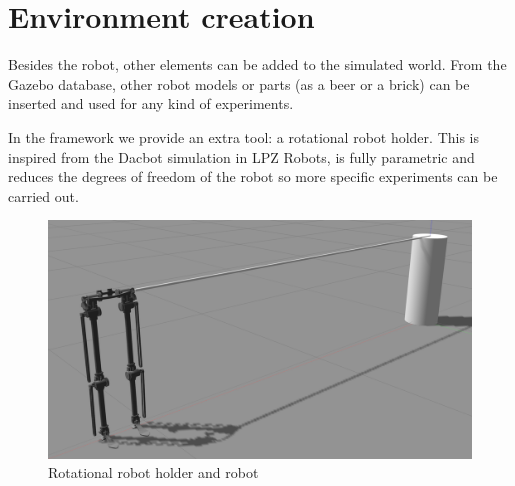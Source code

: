 \section{Environment creation} %
\label{sec:environment_creation}
Besides the robot, other elements can be added to the simulated world.
From the Gazebo database, other robot models or parts (as a beer or a brick) can be inserted and used for any kind of experiments.

In the framework we provide an extra tool: a rotational robot holder.
This is inspired from the Dacbot simulation in LPZ Robots, is fully parametric and reduces the degrees of freedom of the robot so more specific experiments can be carried out.

\begin{figure}[hb!]
  \centering
  \includegraphics[width=0.75\linewidth]{figures/gazebo_rotational_holder}
  \caption{Rotational robot holder and robot}
  \label{fig:rotational_robot_holder}
\end{figure}
